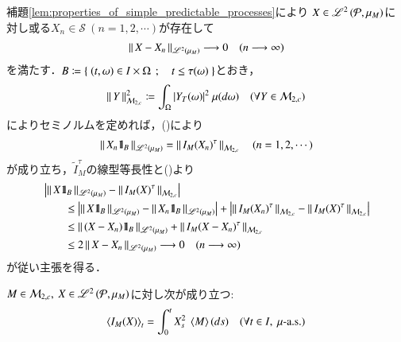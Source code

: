 	\begin{prf}
		補題\ref{lem:properties_of_simple_predictable_processes}により
		$X \in \mathscr{L}^{2} \left(\mathcal{P},\mu_M\right)$に対し或る$X_n \in \mathcal{S}\ (n=1,2,\cdots)$が存在して
		\begin{align}
			\left\|\, X - X_n\, \right\|_{\mathscr{L}^{2} \left(\mu_M\right)} \longrightarrow 0
			\quad (n \longrightarrow \infty)
			\label{eq:thm_stopped_Ito_integral}
		\end{align}
		を満たす．$B \coloneqq \left\{\ (t,\omega) \in I \times \Omega\ \, ; \quad t \leq \tau(\omega)\ \right\}$とおき，
		\begin{align}
			\left\|\, Y\, \right\|_{\mathcal{M}_{2,c}}^2 \coloneqq \int_\Omega |Y_T(\omega)|^2\ \mu(d\omega)
			\quad (\forall Y \in \mathcal{M}_{2,c})
		\end{align}
		によりセミノルムを定めれば，()により
		\begin{align}
			\left\|\, X_n \mbox{1}\hspace{-0.25em}\mbox{l}_B\, \right\|_{\mathscr{L}^{2} \left(\mu_M\right)} 
			= \left\|\, I_M(X_n)^\tau\, \right\|_{\mathcal{M}_{2,c}}
			\quad (n=1,2,\cdots)
		\end{align}
		が成り立ち，$\tilde{I}^\tau_M$の線型等長性と()より
		\begin{align}
			&\left| \left\|\, X \mbox{1}\hspace{-0.25em}\mbox{l}_B\, \right\|_{\mathscr{L}^{2} \left(\mu_M\right)} - \left\|\, I_M(X)^\tau\, \right\|_{\mathcal{M}_{2,c}} \right| \\
			&\qquad \leq \left| \left\|\, X \mbox{1}\hspace{-0.25em}\mbox{l}_B\, \right\|_{\mathscr{L}^{2} \left(\mu_M\right)} - \left\|\, X_n \mbox{1}\hspace{-0.25em}\mbox{l}_B\, \right\|_{\mathscr{L}^{2} \left(\mu_M\right)} \right| 
				+ \left| \left\|\, I_M(X_n)^\tau\, \right\|_{\mathcal{M}_{2,c}} - \left\|\, I_M(X)^\tau\, \right\|_{\mathcal{M}_{2,c}} \right| \\
			&\qquad \leq  \left\|\, (X - X_n) \mbox{1}\hspace{-0.25em}\mbox{l}_B\, \right\|_{\mathscr{L}^{2} \left(\mu_M\right)} 
				+ \left\|\, I_M(X - X_n)^\tau\, \right\|_{\mathcal{M}_{2,c}} \\
			&\qquad \leq 2 \left\|\, X - X_n\, \right\|_{\mathscr{L}^{2} \left(\mu_M\right)} \longrightarrow 0 \quad (n \longrightarrow \infty)
		\end{align}
		が従い主張を得る．
		\QED
	\end{prf}
	
	\begin{screen}
		\begin{prp}[伊藤積分の二次変分]
			$M \in \mathcal{M}_{2,c},\ X \in \mathscr{L}^{2} \left(\mathcal{P},\mu_M\right)$に対し次が成り立つ:
			\begin{align}
				\inprod<I_M(X)>_t = \int_0^t X_s^2\ \inprod<M>(ds)
				\quad (\forall t \in I,\ \mbox{$\mu$-a.s.})
			\end{align}
		\end{prp}
	\end{screen}